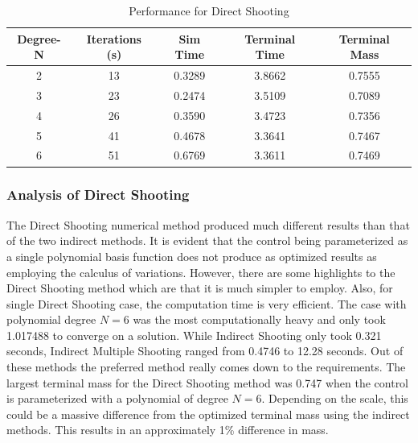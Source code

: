 \documentclass[]{article}
\begin{document}
\FloatBarrier
\begin{table}
	\centering
	\begin{tabular}{||c c c c c||} 
		\hline
		Degree-N & Iterations (s) & Sim Time & Terminal Time & Terminal Mass\\ [0.5ex] 
		\hline\hline
		2           & 13            & 0.3289     &  3.8662     & 0.7555\\
		\hline
		3           & 23            & 0.2474     &  3.5109     & 0.7089\\ 
		\hline
		4           & 26            & 0.3590     &  3.4723     & 0.7356\\ 
		\hline
		5           & 41            & 0.4678     &  3.3641     & 0.7467\\ 
		\hline
		6           & 51            & 0.6769     &  3.3611     & 0.7469\\ [1ex]
		\hline
	\end{tabular}
	\caption{Performance for Direct Shooting}
	\label{table:3}
\end{table}
\FloatBarrier
\subsubsection{Analysis of Direct Shooting}
The Direct Shooting numerical method produced much different results than that of the two indirect methods. It is evident that the control being parameterized as a single polynomial basis function does not produce as optimized results as employing the calculus of variations. However, there are some highlights to the Direct Shooting method which are that it is much simpler to employ. Also, for single Direct Shooting case, the computation time is very efficient. The case with polynomial degree \(N = 6\) was the most computationally heavy and only took 1.017488 to converge on a solution. While Indirect Shooting only took 0.321 seconds, Indirect Multiple Shooting ranged from 0.4746 to 12.28 seconds. Out of these methods the preferred method really comes down to the requirements. The largest terminal mass for the Direct Shooting method was 0.747 when the control is parameterized with a polynomial of degree \(N = 6\). Depending on the scale, this could be a massive difference from the optimized terminal mass using the indirect methods. This results in an approximately 1\% difference in mass.
\end{document}
